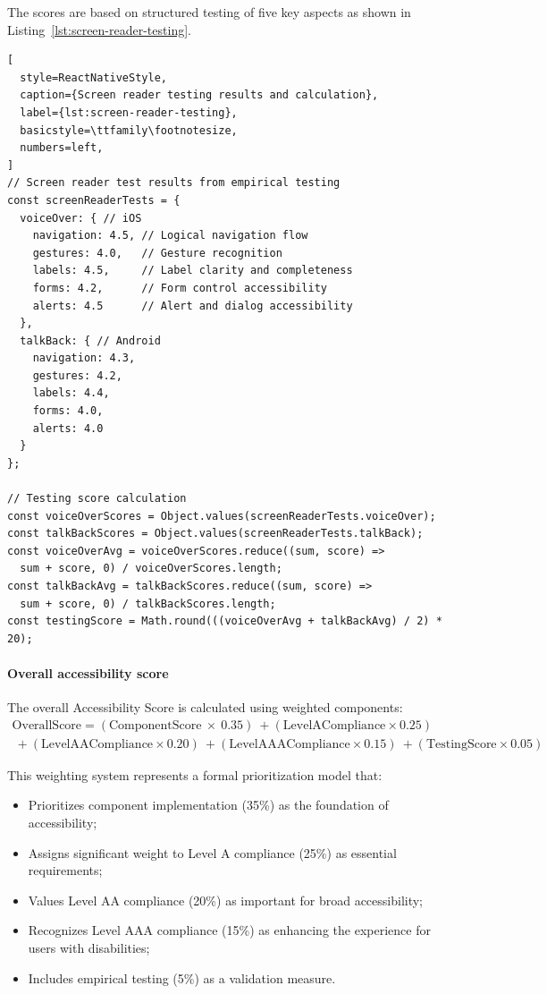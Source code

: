 The scores are based on structured testing of five key aspects as shown in Listing~\ref{lst:screen-reader-testing}.

\begin{lstlisting}[
  style=ReactNativeStyle,
  caption={Screen reader testing results and calculation},
  label={lst:screen-reader-testing},
  basicstyle=\ttfamily\footnotesize,
  numbers=left,
]
// Screen reader test results from empirical testing
const screenReaderTests = {
  voiceOver: { // iOS
    navigation: 4.5, // Logical navigation flow
    gestures: 4.0,   // Gesture recognition
    labels: 4.5,     // Label clarity and completeness
    forms: 4.2,      // Form control accessibility
    alerts: 4.5      // Alert and dialog accessibility
  },
  talkBack: { // Android
    navigation: 4.3,
    gestures: 4.2,
    labels: 4.4,
    forms: 4.0,
    alerts: 4.0
  }
};

// Testing score calculation
const voiceOverScores = Object.values(screenReaderTests.voiceOver);
const talkBackScores = Object.values(screenReaderTests.talkBack);
const voiceOverAvg = voiceOverScores.reduce((sum, score) => 
  sum + score, 0) / voiceOverScores.length;
const talkBackAvg = talkBackScores.reduce((sum, score) => 
  sum + score, 0) / talkBackScores.length;
const testingScore = Math.round(((voiceOverAvg + talkBackAvg) / 2) * 20);
\end{lstlisting}

\FloatBarrier

\paragraph{Overall accessibility score}

The overall Accessibility Score is calculated using weighted components:
\begin{equation}
\begin{split}
\text{OverallScore}
= (\text{ComponentScore} \ \times \ 0.35)  
\ + (\text{LevelACompliance} \times 0.25) \\
\ + (\text{LevelAACompliance} \times 0.20)
\ + (\text{LevelAAACompliance} \times 0.15)
\ + (\text{TestingScore} \times 0.05)
\end{split}
\end{equation}

This weighting system represents a formal prioritization model that:
\begin{itemize}
\item Prioritizes component implementation (35\%) as the foundation of accessibility;
\item Assigns significant weight to Level A compliance (25\%) as essential requirements;
\item Values Level AA compliance (20\%) as important for broad accessibility;
\item Recognizes Level AAA compliance (15\%) as enhancing the experience for users with disabilities;
\item Includes empirical testing (5\%) as a validation measure.
\end{itemize}

